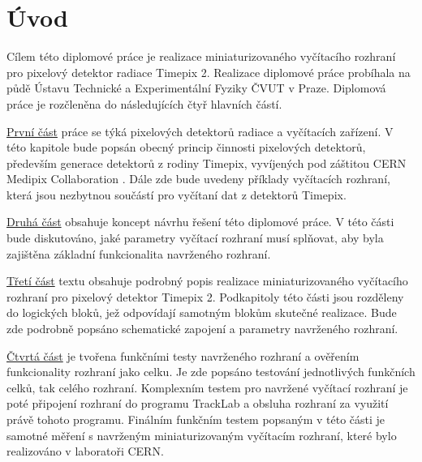 \chapter{Úvod}



Cílem této diplomové práce je realizace miniaturizovaného vyčítacího rozhraní pro pixelový detektor radiace Timepix 2. Realizace diplomové práce probíhala na půdě Ústavu Technické a Experimentální Fyziky ČVUT v Praze. Diplomová práce je rozčleněna do následujících čtyř hlavních částí.

\par \hyperref[kap:2]{První část} práce se týká pixelových detektorů radiace a vyčítacích zařízení. V této kapitole bude popsán obecný princip činnosti pixelových detektorů, především generace detektorů z rodiny Timepix, vyvíjených pod záštitou CERN Medipix Collaboration \cite{Medpix}. Dále zde bude uvedeny příklady vyčítacích rozhraní, která jsou nezbytnou součástí pro vyčítaní dat z detektorů Timepix.

\par \hyperref[Koncept reseni]{Druhá část} obsahuje koncept návrhu řešení této diplomové práce. V této části bude diskutováno, jaké parametry vyčítací rozhraní musí splňovat, aby byla zajištěna základní funkcionalita navrženého rozhraní.

\par \hyperref[realizace]{Třetí část} textu obsahuje podrobný popis realizace miniaturizovaného vyčítacího rozhraní pro pixelový detektor Timepix 2. Podkapitoly této části jsou rozděleny do logických bloků, jež odpovídají samotným blokům skutečné realizace. Bude zde podrobně popsáno schematické zapojení a parametry navrženého rozhraní.

\par \hyperref[testovani]{Čtvrtá část} je tvořena funkčními testy navrženého rozhraní a ověřením funkcionality rozhraní jako celku. Je zde popsáno testování jednotlivých funkčních celků, tak celého rozhraní. Komplexním testem pro navržené vyčítací rozhraní je poté připojení rozhraní do programu TrackLab \cite{Manek_2024} a obsluha rozhraní za využití právě tohoto programu. Finálním funkčním testem popsaným v této části je samotné měření s navrženým miniaturizovaným vyčítacím rozhraní, které bylo realizováno v laboratoři CERN.
